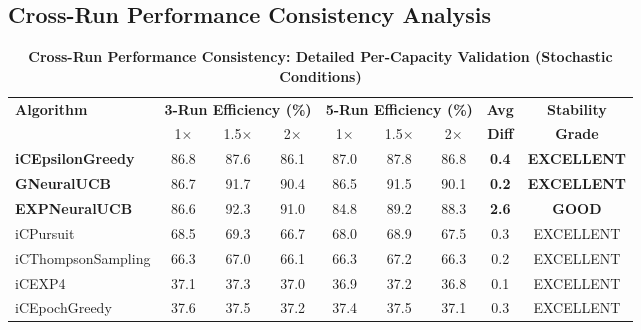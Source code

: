 \documentclass[12pt,a4paper]{article}
\newcommand{\success}[1]{\textcolor{accentgreen}{\textbf{#1}}}
\newcommand{\legacy}[1]{\textcolor{legacycolor}{\textbf{#1}}}
\newcommand{\neural}[1]{\textcolor{neuralcolor}{\textbf{#1}}}
\begin{document}
\subsection{Cross-Run Performance Consistency Analysis}

\begin{table}[H]
\centering
\caption{\success{Cross-Run Performance Consistency: Detailed Per-Capacity Validation (Stochastic Conditions)}}
\label{tab:cross-run-consistency}
\begin{tabular}{@{}lcccccccc@{}}
\toprule
\textbf{Algorithm} & \multicolumn{3}{c}{\textbf{3-Run Efficiency (\%)}} & \multicolumn{3}{c}{\textbf{5-Run Efficiency (\%)}} & \textbf{Avg} & \textbf{Stability} \\
\cline{2-4} \cline{5-7}
& 1$\times$ & 1.5$\times$ & 2$\times$ & 1$\times$ & 1.5$\times$ & 2$\times$ & \textbf{Diff} & \textbf{Grade} \\
\midrule
\success{iCEpsilonGreedy} & 86.8 & 87.6 & 86.1 & 87.0 & 87.8 & 86.8 & \success{0.4} & \success{EXCELLENT} \\
\neural{GNeuralUCB} & 86.7 & 91.7 & 90.4 & 86.5 & 91.5 & 90.1 & \neural{0.2} & \neural{EXCELLENT} \\
\legacy{EXPNeuralUCB} & 86.6 & 92.3 & 91.0 & 84.8 & 89.2 & 88.3 & \legacy{2.6} & \legacy{GOOD} \\
iCPursuit & 68.5 & 69.3 & 66.7 & 68.0 & 68.9 & 67.5 & 0.3 & EXCELLENT \\
iCThompsonSampling & 66.3 & 67.0 & 66.1 & 66.3 & 67.2 & 66.3 & 0.2 & EXCELLENT \\
iCEXP4 & 37.1 & 37.3 & 37.0 & 36.9 & 37.2 & 36.8 & 0.1 & EXCELLENT \\
iCEpochGreedy & 37.6 & 37.5 & 37.2 & 37.4 & 37.5 & 37.1 & 0.3 & EXCELLENT \\
\bottomrule
\end{tabular}
\end{table}
\end{document}
